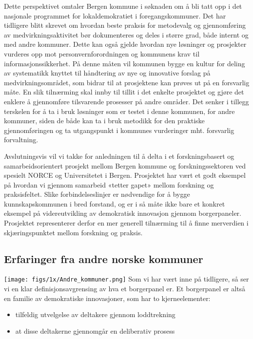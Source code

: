 \documentclass[
  12pt,
  a4paper, 12pt]{article}
\providecommand{\tightlist}{%
  \setlength{\itemsep}{0pt}\setlength{\parskip}{0pt}}
\begin{document}
Dette perspektivet omtaler Bergen kommune i søknaden om å bli tatt opp i det nasjonale programmet for lokaldemokratiet i foregangskommuner. Det har tidligere blitt skrevet om hvordan beste praksis for metodevalg og gjennomføring av medvirkningsaktivitet bør dokumenteres og deles i større grad, både internt og med andre kommuner. Dette kan også gjelde hvordan nye løsninger og prosjekter vurderes opp mot personvernforordningen og kommunens krav til informasjonssikkerhet. På denne måten vil kommunen bygge en kultur for deling av systematikk knyttet til håndtering av nye og innovative forslag på medvirkningsområdet, som bidrar til at prosjektene kan prøves ut på en forsvarlig måte. En slik tilnærming skal innby til tillit i det enkelte prosjektet og gjøre det enklere å gjennomføre tilsvarende prosesser på andre områder. Det senker i tillegg terskelen for å ta i bruk løsninger som er testet i denne kommunen, for andre kommuner, siden de både kan ta i bruk metodikk for den praktiske gjennomføringen og ta utgangspunkt i kommunes vurderinger mht. forsvarlig forvaltning.

Avslutningsvis vil vi takke for anledningen til å delta i et forskningsbasert og samarbeidsorientert prosjekt mellom Bergen kommune og forskningssektoren ved spesielt NORCE og Universitetet i Bergen. Prosjektet har vært et godt eksempel på hvordan vi gjennom samarbeid «tetter gapet» mellom forskning og praksisfeltet. Slike forbindelseslinjer er nødvendige for å bygge kunnskapskommunen i bred forstand, og er i så måte ikke bare et konkret eksempel på videreutvikling av demokratisk innovasjon gjennom borgerpaneler. Prosjektet representerer derfor en mer generell tilnærming til å finne merverdien i skjæringspunktet mellom forskning og praksis.

\newpage

\hypertarget{andre}{%
\subsection{Erfaringer fra andre norske kommuner}\label{andre}}

\texttt{[image: figs/1x/Andre\_kommuner.png]}
Som vi har vært inne på tidligere, så ser vi en klar definisjonsavgrensing av hva et borgerpanel er. Et borgerpanel er altså en familie av demokratiske innovasjoner, som har to kjerneelementer:

\begin{itemize}
\tightlist
\item
  tilfeldig utvelgelse av deltakere gjennom loddtrekning\\
\item
  at disse deltakerne gjennomgår en deliberativ prosess
\end{itemize}
\end{document}
